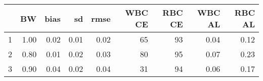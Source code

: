\begin{table}[ht]
\centering
\begin{tabular}{rrrrrrrrr}
  \hline
 & BW & bias & sd & rmse & WBC CE & RBC CE & WBC AL & RBC AL \\
  \hline
1 & 1.00 & 0.02 & 0.01 & 0.02 & 65 & 93 & 0.04 & 0.12 \\
  2 & 0.80 & 0.01 & 0.02 & 0.03 & 80 & 95 & 0.07 & 0.23 \\
  3 & 0.90 & 0.04 & 0.02 & 0.04 & 31 & 94 & 0.06 & 0.17 \\
   \hline
\end{tabular}
\end{table}
